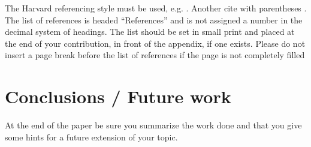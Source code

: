 \documentclass[12pt]{article}
\begin{document}
The Harvard referencing style must be used, e.g. \citealp{Ashrae2005}. Another cite with parentheses \citep{Mawdesley2004}. The list of references is headed “References” and is not assigned a number in the decimal system of headings. The list should be set in small print and placed at the end of your contribution, in front of the appendix, if one exists. Please do not insert a page break before the list of references if the page is not completely filled

\section{Conclusions / Future work}

At the end of the paper be sure you summarize the work done and that you give some hints for a future extension of your topic. 


\end{document}
